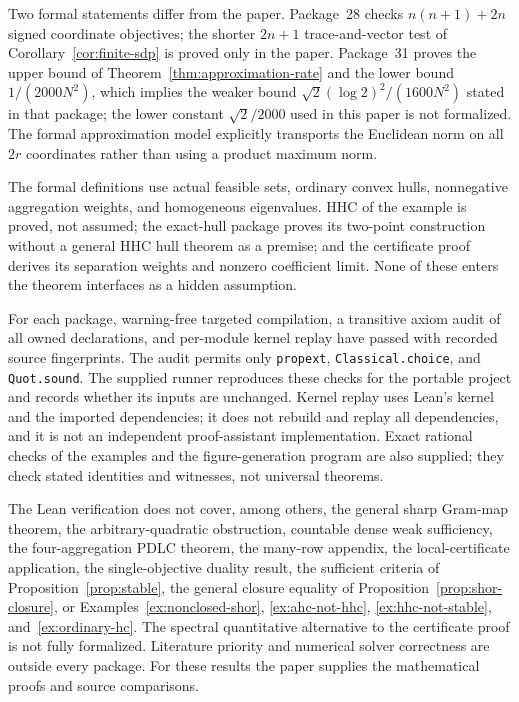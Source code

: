 Two formal statements differ from the paper. Package~28 checks
$n(n+1)+2n$ signed coordinate objectives; the shorter $2n+1$
trace-and-vector test of Corollary~\ref{cor:finite-sdp} is proved only
in the paper. Package~31 proves the upper bound of
Theorem~\ref{thm:approximation-rate} and the lower bound
$1/(2000N^2)$, which implies the weaker bound
$\sqrt2(\log2)^2/(1600N^2)$ stated in that package; the lower constant $\sqrt2/2000$ used
in this paper is not formalized. The formal approximation model
explicitly transports the Euclidean norm on all $2r$ coordinates rather
than using a product maximum norm.

The formal definitions use actual feasible sets, ordinary convex hulls,
nonnegative aggregation weights, and homogeneous eigenvalues. HHC of the
example is proved, not assumed; the exact-hull package proves its
two-point construction without a general HHC hull theorem as a premise;
and the certificate proof derives its separation weights and nonzero
coefficient limit. None of these enters the theorem interfaces as a
hidden assumption.

For each package, warning-free targeted compilation, a transitive axiom
audit of all owned declarations, and per-module kernel replay have passed
with recorded source fingerprints. The audit permits only
\texttt{propext}, \texttt{Classical.choice}, and \texttt{Quot.sound}.
The supplied runner reproduces these checks for the portable project and
records whether its inputs are unchanged. Kernel replay uses Lean's
kernel and the imported dependencies; it does not rebuild and replay all
dependencies, and it is not an independent proof-assistant
implementation. Exact rational checks of the examples and the
figure-generation program are also supplied; they check stated
identities and witnesses, not universal theorems.

The Lean verification does not cover, among others, the general sharp
Gram-map theorem,
the arbitrary-quadratic obstruction, countable dense weak sufficiency,
the four-aggregation PDLC theorem,
the many-row appendix, the local-certificate application, the
single-objective duality result, the sufficient criteria of
Proposition~\ref{prop:stable}, the general closure equality of
Proposition~\ref{prop:shor-closure}, or
Examples~\ref{ex:nonclosed-shor}, \ref{ex:ahc-not-hhc},
\ref{ex:hhc-not-stable}, and~\ref{ex:ordinary-hc}. The spectral quantitative alternative
to the certificate proof is not fully formalized. Literature priority
and numerical solver correctness are outside every package. For these
results the paper supplies the mathematical proofs and source
comparisons.
